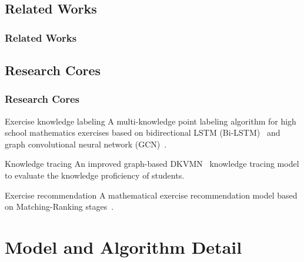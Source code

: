 \documentclass[10pt,aspectratio=43,mathserif]{beamer}
\begin{document}
\subsection{Related Works}
\begin{frame}
	\frametitle{Related Works}



\end{frame}


\subsection{Research Cores}
\begin{frame}
	\frametitle{Research Cores}
	\begin{block}{Exercise knowledge labeling}
		A multi-knowledge point labeling algorithm for high school mathematics exercises based on bidirectional LSTM (Bi-LSTM)~\cite{chen2017improving} and graph convolutional neural network (GCN)~\cite{kipf2016semi}.
	\end{block}
	\begin{block}{Knowledge tracing}
		An improved graph-based DKVMN~\cite{zhang2017dynamic} knowledge tracing model to evaluate the knowledge proficiency of students.
	\end{block}
	\begin{block}{Exercise recommendation}
		A mathematical exercise recommendation model based on Matching-Ranking stages~\cite{segev2009context}.
	\end{block}
\end{frame}
\section{Model and Algorithm Detail}
\end{document}
